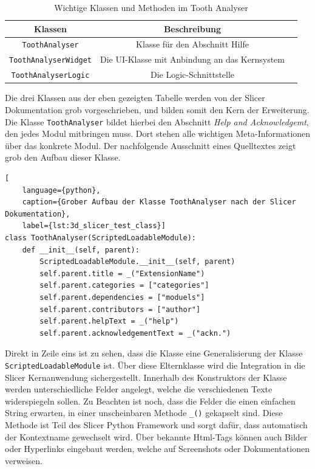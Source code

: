 \begin{table}[h]
	\centering
	\begin{tabular}{|c|c|c|}
		\hline
		\textbf{Klassen}             & \textbf{Beschreibung}                              \\
		\hline
		\texttt{ToothAnalyser}       & Klasse für den Abschnitt Hilfe                     \\
		\hline
		\texttt{ToothAnalyserWidget} & Die \ac{UI}-Klasse mit Anbindung an das Kernsystem \\
		\hline
		\texttt{ToothAnalyserLogic}  & Die Logic-Schnittstelle                            \\
		\hline
	\end{tabular}
	\caption{Wichtige Klassen und Methoden im Tooth Analyser}
	\label{tab:methoden_klassen}
\end{table}

Die drei Klassen aus der eben gezeigten Tabelle werden von der Slicer Dokumentation
grob vorgeschrieben, und bilden somit den Kern der Erweiterung. Die Klasse \texttt{ToothAnalyser}
bildet hierbei den Abschnitt \textit{Help and Acknowledgemt}, den jedes Modul
mitbringen muss. Dort stehen alle wichtigen Meta-Informationen über das konkrete
Modul. Der nachfolgende Ausschnitt eines Quelltextes zeigt grob den Aufbau
dieser Klasse.

\begin{lstlisting}[
    language={python},
    caption={Grober Aufbau der Klasse ToothAnalyser nach der Slicer Dokumentation},
    label={lst:3d_slicer_test_class}]
class ToothAnalyser(ScriptedLoadableModule):
    def __init__(self, parent):
	    ScriptedLoadableModule.__init__(self, parent)
	    self.parent.title = _("ExtensionName")
	    self.parent.categories = ["categories"]
	    self.parent.dependencies = ["moduels"]
	    self.parent.contributors = ["author"]
	    self.parent.helpText = _("help")
	    self.parent.acknowledgementText = _("ackn.")
\end{lstlisting}

Direkt in Zeile eins ist zu sehen, dass die Klasse eine Generalisierung der
Klasse \texttt{ScriptedLoadableModule} ist. Über diese Elternklasse wird die
Integration in die Slicer Kernanwendung sichergestellt. Innerhalb des Konstruktors
der Klasse werden unterschiedliche Felder angelegt, welche die verschiedenen
Texte widerspiegeln sollen. Zu Beachten ist noch, dass die Felder die einen
einfachen String erwarten, in einer unscheinbaren Methode \texttt{\_()}
gekapselt sind. Diese Methode ist Teil des Slicer Python Framework und sorgt dafür,
dass automatisch der Kontextname gewechselt wird. Über bekannte Html-Tags können
auch Bilder oder Hyperlinks eingebaut werden, welche auf Screenshots oder
Dokumentationen verweisen.

